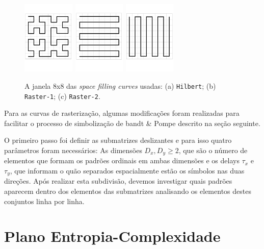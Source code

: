 \documentclass[remotesensing,article,submit,moreauthors,pdftex,10pt,a4paper]{Definitions/mdpi}
\begin{document}
	\begin{figure}[hbt]
		\centering
		\includegraphics[width=2.5cm,height=3.5cm]{Figures/hilbert.png}
		\includegraphics[width=2.5cm,height=3.5cm]{Figures/raster1.png}
		\includegraphics[width=2.5cm,height=3.5cm]{Figures/raster2.png}
		\vspace{-0.5cm}
		\caption{A janela 8x8 das \textit{space filling curves} usadas: (a) \texttt{Hilbert}; (b) \texttt{Raster-1}; (c) \texttt{Raster-2}.}
		\label{fig:FillingCurves}
	\end{figure}
	
	Para as curvas de rasterização, algumas modificações foram realizadas para facilitar o processo de simbolização de bandt \& Pompe descrito na seção seguinte. 
	
	O primeiro passo foi definir as submatrizes deslizantes e para isso quatro parâmetros foram necessários: As dimensões $D_{x}, D_{y} \geq 2$, que são o número de elementos que formam os padrões ordinais em ambas dimensões e os delays $\tau _{x}$ e $\tau_{y}$, que informam o quão separados espacialmente estão os símbolos nas duas direções. Após realizar esta subdivisão, devemos investigar quais padrões aparecem dentro dos elementos das submatrizes analisando os elementos destes conjuntos linha por linha.
	
	\section{Plano Entropia-Complexidade}\label{HC}
	
\end{document}
